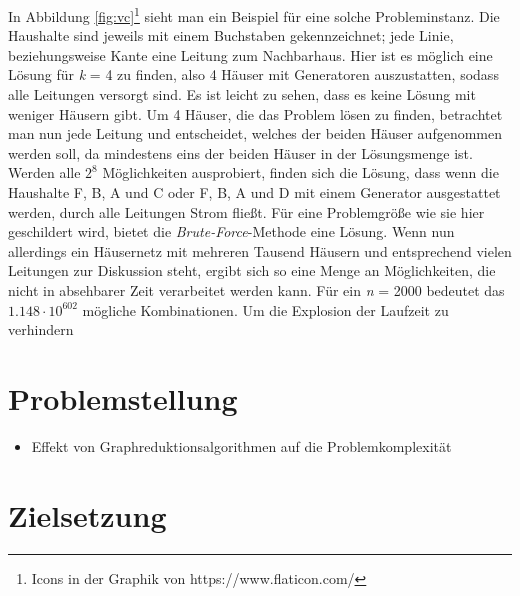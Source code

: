 In Abbildung \ref{fig:vc}\footnote{Icons in der Graphik von https://www.flaticon.com/}   sieht man ein Beispiel für eine solche Probleminstanz. Die Haushalte sind jeweils mit einem Buchstaben gekennzeichnet; jede Linie, beziehungsweise Kante eine Leitung zum Nachbarhaus. Hier ist es möglich eine Lösung für \emph{k} = 4 zu finden, also 4 Häuser mit Generatoren auszustatten, sodass alle Leitungen versorgt sind. Es ist leicht zu sehen, dass es keine Lösung mit weniger Häusern gibt. Um 4 Häuser, die das Problem lösen zu finden, betrachtet man nun jede Leitung und entscheidet, welches der beiden Häuser aufgenommen werden soll, da mindestens eins der beiden Häuser in der Lösungsmenge ist. Werden alle $2^{8}$ Möglichkeiten ausprobiert, finden sich die Lösung, dass wenn die Haushalte F, B, A und C oder F, B, A und D mit einem Generator ausgestattet werden, durch alle Leitungen Strom fließt. Für eine Problemgröße wie sie hier geschildert wird, bietet die \emph{Brute-Force}-Methode eine Lösung. Wenn nun allerdings ein Häusernetz mit mehreren Tausend Häusern und entsprechend vielen Leitungen zur Diskussion steht, ergibt sich so eine Menge an Möglichkeiten, die nicht in absehbarer Zeit verarbeitet werden kann. Für ein \emph{n} = 2000 bedeutet das $1.148 \cdot 10^{602}$ mögliche Kombinationen. Um die Explosion der Laufzeit zu verhindern 

\section{Problemstellung}
\label{ch:Einleitung:sec:Problemstellung}

\begin{itemize}
\item Effekt von Graphreduktionsalgorithmen auf die Problemkomplexität
\end{itemize}

\section{Zielsetzung}
\label{ch:Einleitung:sec:Zielsetzung}


